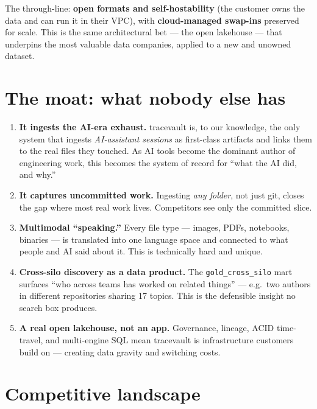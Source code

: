 \documentclass[11pt]{article}
\newcommand{\code}[1]{{\small\texttt{#1}}}
\begin{document}
\noindent The through-line: \textbf{open formats and self-hostability} (the customer owns the data and
can run it in their VPC), with \textbf{cloud-managed swap-ins} preserved for scale. This is the same
architectural bet --- the open lakehouse --- that underpins the most valuable data companies, applied
to a new and unowned dataset.

\section{The moat: what nobody else has}

\begin{enumerate}[leftmargin=1.4em,itemsep=3pt]
  \item \textbf{It ingests the AI-era exhaust.} tracevault is, to our knowledge, the only system that
  ingests \emph{AI-assistant sessions} as first-class artifacts and links them to the real files they
  touched. As AI tools become the dominant author of engineering work, this becomes the system of
  record for ``what the AI did, and why.''
  \item \textbf{It captures uncommitted work.} Ingesting \emph{any folder}, not just git, closes the
  gap where most real work lives. Competitors see only the committed slice.
  \item \textbf{Multimodal ``speaking.''} Every file type --- images, PDFs, notebooks, binaries --- is
  translated into one language space and connected to what people and AI said about it. This is
  technically hard and unique.
  \item \textbf{Cross-silo discovery as a data product.} The \code{gold\_cross\_silo} mart surfaces
  ``who across teams has worked on related things'' --- e.g.\ two authors in different repositories
  sharing 17 topics. This is the defensible insight no search box produces.
  \item \textbf{A real open lakehouse, not an app.} Governance, lineage, ACID time-travel, and
  multi-engine SQL mean tracevault is infrastructure customers build on --- creating data gravity and
  switching costs.
\end{enumerate}

\section{Competitive landscape}
\end{document}
